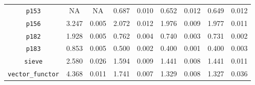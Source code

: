 \documentclass[12pt,a4paper,twoside,openright]{report}
\begin{document}
\begin{figure}[h]
\begin{tabular}{| c | c c | c c | c c | c c |}
\lstinline!p153!              &                                NA &    NA & \cellcolor[hsb]{0.0,0.357,1}0.687 & 0.010 & \cellcolor[hsb]{0.0,0.314,1}0.652 & 0.012 & \cellcolor[hsb]{0.0,0.310,1}0.649 & 0.012 \\
\lstinline!p156!              & \cellcolor[hsb]{0.0,1.000,1}3.247 & 0.005 & \cellcolor[hsb]{0.0,0.511,1}2.072 & 0.012 & \cellcolor[hsb]{0.0,0.464,1}1.976 & 0.009 & \cellcolor[hsb]{0.0,0.465,1}1.977 & 0.011 \\
\lstinline!p182!              & \cellcolor[hsb]{0.0,0.368,1}1.928 & 0.005 & \cellcolor[hsb]{0.3,0.314,1}0.762 & 0.004 & \cellcolor[hsb]{0.3,0.334,1}0.740 & 0.003 & \cellcolor[hsb]{0.3,0.342,1}0.731 & 0.002 \\
\lstinline!p183!              & \cellcolor[hsb]{0.0,0.458,1}0.853 & 0.005 & \cellcolor[hsb]{0.0,0.062,1}0.500 & 0.002 & \cellcolor[hsb]{0.3,0.102,1}0.400 & 0.001 & \cellcolor[hsb]{0.3,0.102,1}0.400 & 0.003 \\
\lstinline!sieve!             & \cellcolor[hsb]{0.3,0.066,1}2.580 & 0.026 & \cellcolor[hsb]{0.3,0.423,1}1.594 & 0.009 & \cellcolor[hsb]{0.3,0.478,1}1.441 & 0.008 & \cellcolor[hsb]{0.3,0.478,1}1.441 & 0.011 \\
\lstinline!vector_functor!    & \cellcolor[hsb]{0.3,0.272,1}4.368 & 0.011 & \cellcolor[hsb]{0.3,0.710,1}1.741 & 0.007 & \cellcolor[hsb]{0.3,0.779,1}1.329 & 0.008 & \cellcolor[hsb]{0.3,0.779,1}1.327 & 0.036 \\
\hline
\end{tabular}


\end{figure}
\end{document}
